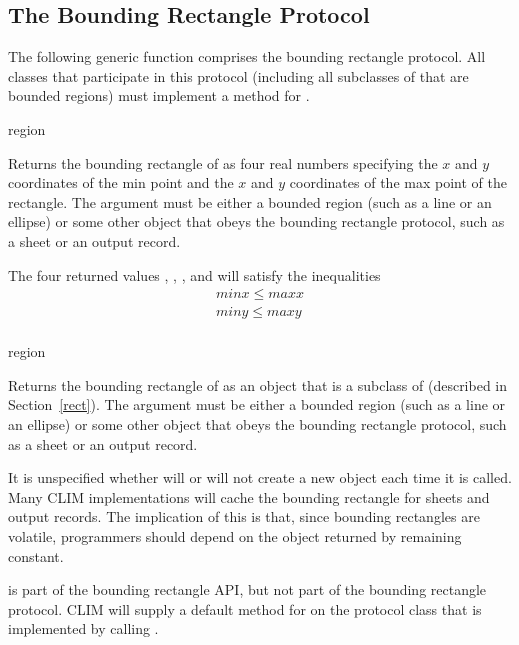 \FreshOutputs


\subsection {The Bounding Rectangle Protocol}

The following generic function comprises the bounding rectangle protocol.  All
classes that participate in this protocol (including all subclasses of
 that are bounded regions) must implement a method for
.

 {region}

Returns the bounding rectangle of  as four real numbers specifying
the $x$ and $y$ coordinates of the min point and the $x$ and $y$ coordinates of
the max point of the rectangle.  The argument  must be either a
bounded region (such as a line or an ellipse) or some other object that obeys
the bounding rectangle protocol, such as a sheet or an output record.

The four returned values , , , and 
will satisfy the inequalities
\begin{eqnarray*}
  minx \leq maxx \\
  miny \leq maxy \\
\end{eqnarray*}


 {region}

Returns the bounding rectangle of  as an object that is a subclass
of  (described in Section~\ref{rect}).  The argument 
must be either a bounded region (such as a line or an ellipse) or some other
object that obeys the bounding rectangle protocol, such as a sheet or an output
record.

It is unspecified whether  will or will not create a new
object each time it is called.  Many CLIM implementations will cache the
bounding rectangle for sheets and output records.  The implication of this is
that, since bounding rectangles are volatile, programmers should depend on the
object returned by  remaining constant.

 is part of the bounding rectangle API, but not part of
the bounding rectangle protocol.  CLIM will supply a default method for
 on the protocol class  that is
implemented by calling .



